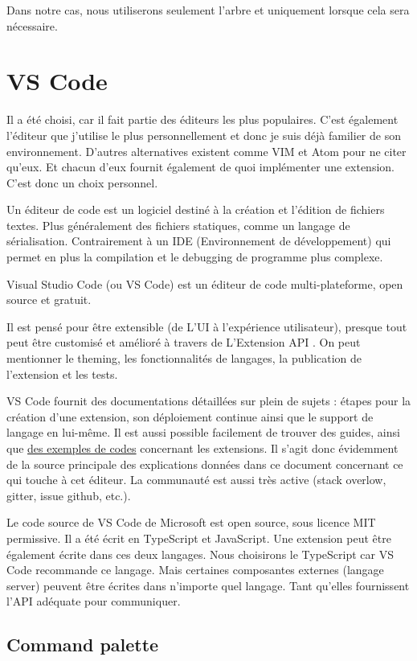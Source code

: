 \documentclass[
    iict, %
    il, %
]{heig-tb}
\begin{document}
Dans notre cas, nous utiliserons seulement l'arbre et uniquement lorsque cela sera nécessaire.

\section{VS Code}
Il a été choisi, car il fait partie des éditeurs les plus populaires. C'est également l'éditeur que j'utilise le plus personnellement et donc je suis déjà familier de son environnement.
D'autres alternatives existent comme VIM et Atom pour ne citer qu'eux. Et chacun d'eux fournit également de quoi implémenter une extension.
C'est donc un choix personnel.

Un éditeur de code est un logiciel destiné à la création et l'édition de fichiers textes. Plus généralement des fichiers statiques, comme un langage de sérialisation. Contrairement à un IDE (Environnement de développement) qui permet en plus la compilation et le debugging de programme plus complexe.

Visual Studio Code (ou VS Code) est un éditeur de code multi-plateforme, open source et gratuit.

Il est pensé pour être extensible (de L'UI à l'expérience utilisateur), presque tout peut être customisé et amélioré à travers de L'Extension API \cite{extension-api}.
On peut mentionner le theming, les fonctionnalités de langages, la publication de l'extension et les tests.

VS Code fournit des documentations détaillées sur plein de sujets : étapes pour la création d'une extension, son déploiement continue ainsi que le support de langage en lui-même.
Il est aussi possible facilement de trouver des guides, ainsi que \href{https://github.com/microsoft/vscode-extension-samples}{des exemples de codes} concernant les extensions.
Il s'agit donc évidemment de la source principale des explications données dans ce document concernant ce qui touche à cet éditeur.
La communauté est aussi très active (stack overlow, gitter, issue github, etc.).

Le code source de VS Code de Microsoft est open source, sous licence MIT permissive.
Il a été écrit en TypeScript et JavaScript. Une extension peut être également écrite dans ces deux langages.
Nous choisirons le TypeScript car VS Code recommande ce langage. Mais certaines composantes externes (langage server) peuvent être écrites dans n'importe quel langage. Tant qu'elles fournissent l'API adéquate pour communiquer.

\subsection{Command palette}\label{command-palette}
\end{document}
